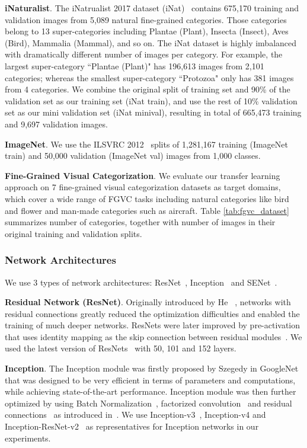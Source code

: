 \documentclass[10pt,twocolumn,letterpaper]{article}
\begin{document}
\textbf{iNaturalist}.
The iNatrualist 2017 dataset (iNat)~\cite{inaturalist} contains 675,170 training and validation images from 5,089 natural fine-grained categories.
Those categories belong to 13 super-categories including Plantae (Plant), Insecta (Insect), Aves (Bird), Mammalia (Mammal), and so on.
The iNat dataset is highly imbalanced with dramatically different number of images per category.
For example, the largest super-category ``Plantae (Plant)" has 196,613 images from 2,101 categories; whereas the smallest super-category ``Protozoa" only has 381 images from 4 categories.
We combine the original split of training set and 90\% of the validation set as our training set (iNat train), and use the rest of 10\% validation set as our mini validation set (iNat minival), resulting in total of 665,473 training and 9,697 validation images.



\textbf{ImageNet}.
We use the ILSVRC 2012~\cite{ilsvrc} splits of 1,281,167 training (ImageNet train) and 50,000 validation (ImageNet val) images from 1,000 classes.

\textbf{Fine-Grained Visual Categorization}.
We evaluate our transfer learning approach on 7 fine-grained visual categorization datasets as target domains, which cover a wide range of FGVC tasks including natural categories like bird and flower and man-made categories such as aircraft. 
Table \ref{tab:fgvc_dataset} summarizes number of categories, together with number of images in their original training and validation splits.


\subsubsection{Network Architectures}
\label{sec:exp_network}

We use 3 types of network architectures: ResNet~\cite{resnet, resnet-v2}, Inception~\cite{googlenet, inception-v3, inception-v4} and SENet~\cite{senet}.

\textbf{Residual Network (ResNet)}.
Originally introduced by He \etal~\cite{resnet}, networks with residual connections greatly reduced the optimization difficulties and enabled the training of much deeper networks.
ResNets were later improved by pre-activation that uses identity mapping as the skip connection between residual modules~\cite{resnet-v2}.
We used the latest version of ResNets~\cite{resnet-v2} with 50, 101 and 152 layers.

\textbf{Inception}.
The Inception module was firstly proposed by Szegedy \etal in GoogleNet~\cite{googlenet} that was designed to be very efficient in terms of parameters and computations, while achieving state-of-the-art performance.
Inception module was then further optimized by using Batch Normalization~\cite{bn}, factorized convolution~\cite{inception-v3, inception-v4} and residual connections~\cite{inception-v4} as introduced in~\cite{resnet}.
We use Inception-v3~\cite{inception-v3}, Inception-v4 and Inception-ResNet-v2~\cite{inception-v4} as representatives for Inception networks in our experiments.
\end{document}
